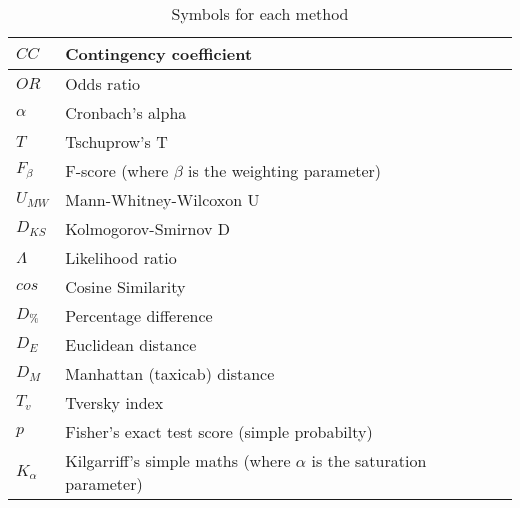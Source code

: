 \documentclass[11pt]{article}
\begin{document}
\begin{table}[h]
\begin{tabular}{|l|l|}
$CC$                & Contingency coefficient 
\\ \hline

$OR$                & Odds ratio
\\ \hline

$\alpha$            & Cronbach's alpha
\\ \hline

$T$                 & Tschuprow's T
\\ \hline

$F_\beta$           & F-score (where $\beta$ is the weighting parameter)
\\ \hline

$U_{MW}$            & Mann-Whitney-Wilcoxon U
\\ \hline

$D_{KS}$            & Kolmogorov-Smirnov D
\\ \hline

$\Lambda$           & Likelihood ratio
\\ \hline

$cos$               & Cosine Similarity
\\ \hline

$D_\%$              & Percentage difference 
\\ \hline

$D_E$               & Euclidean distance
\\ \hline

$D_M$               & Manhattan (taxicab) distance
\\ \hline

$T_v$               & Tversky index
\\ \hline

$p$                 & Fisher's exact test score (simple probabilty)
\\ \hline

$K_{\alpha}$        & Kilgarriff's simple maths (where $\alpha$ is the saturation parameter)
\\ \hline
\end{tabular}
\caption{Symbols for each method}
\label{tab:symbols}
\end{table}
\end{document}
